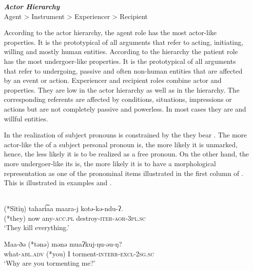 \documentclass[output=paper]{LSP/langsci}
\begin{document}
\ea
\textbf{\textit{Actor Hierarchy}}\\ 
Agent > Instrument > Experiencer > Recipient
\z


According to the actor hierarchy, the agent role has the most actor-like properties. It is the prototypical  of all arguments that refer to acting, initiating, willing and mostly human entities. According to the  hierarchy the patient role has the most undergoer-like properties. It is the prototypical  of all arguments that refer to undergoing, passive and often non-human entities that are affected by an event or action. Experiencer and recipient roles combine actor and  properties. They are low in the actor hierarchy as well as in the  hierarchy. The corresponding referents are affected by conditions, situations, impressions or actions but are not completely passive and powerless. In most cases they are  and willful entities.

In  the realization of subject pronouns is constrained by the  they bear \citep[248--262]{Wratil2013Distribution}. The more actor-like the  of a subject personal pronoun is, the more likely it is unmarked, hence, the less likely it is to be realized as a free pronoun. On the other hand, the more undergoer-like its  is, the more likely it is to have a morphological representation as one of the pronominal items illustrated in the first column of . This is illustrated in examples  and . 

\ea\label{12-wr-ex:4}
\\
 
\ea \label{12-wr-ex:4a}
\gll (*Sïtïŋ) tahari͡aa maara-j kotə-kə-ndu-ʔ.\\
 (*they) now any-\textsc{acc.pl} destroy\textsc{-iter-aor-3pl.sc}\\
\glt  ‘They kill everything.’ 

\ex \label{12-wr-ex:4b}
\gll Maa-ðə (*tənə) mənə muaʔkuj-ŋu-əu-ŋ?\\
what-\textsc{abl.adv} (*you) I torment-\textsc{interr-excl-2sg.sc}\\
\glt ‘Why are you tormenting me?’
\z
\z
\end{document}
